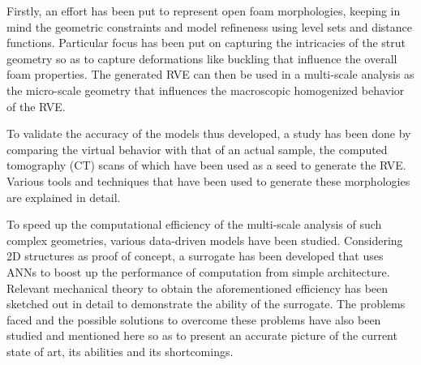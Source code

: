 Firstly, an effort has been put to represent open foam morphologies, keeping in mind the geometric constraints and model refineness using level sets and distance functions. Particular focus has been put on capturing the intricacies of the strut geometry so as to capture deformations like buckling that influence the overall foam properties. The generated RVE can then be used in a multi-scale analysis as the micro-scale geometry that influences the macroscopic homogenized behavior of the RVE. 

To validate the accuracy of the models thus developed, a study has been done by comparing the virtual behavior with that of an actual sample, the computed tomography (CT) scans of which have been used as a seed to generate the RVE. Various tools and techniques that have been used to generate these morphologies are explained in detail. 

To speed up the computational efficiency of the multi-scale analysis of such complex geometries, various data-driven models have been studied. Considering 2D structures as proof of concept, a surrogate has been developed that uses ANNs to boost up the performance of computation from simple architecture. Relevant mechanical theory to obtain the aforementioned efficiency has been sketched out in detail to demonstrate the ability of the surrogate. The problems faced and the possible solutions to overcome these problems have also been studied and mentioned here so as to present an accurate picture of the current state of art, its abilities and its shortcomings.

